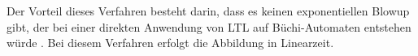 Der Vorteil dieses Verfahren besteht darin, dass es keinen exponentiellen Blowup gibt, der bei einer direkten Anwendung von LTL auf Büchi-Automaten entstehen würde \cite{vardi+96}. Bei diesem Verfahren erfolgt die Abbildung in Linearzeit.



